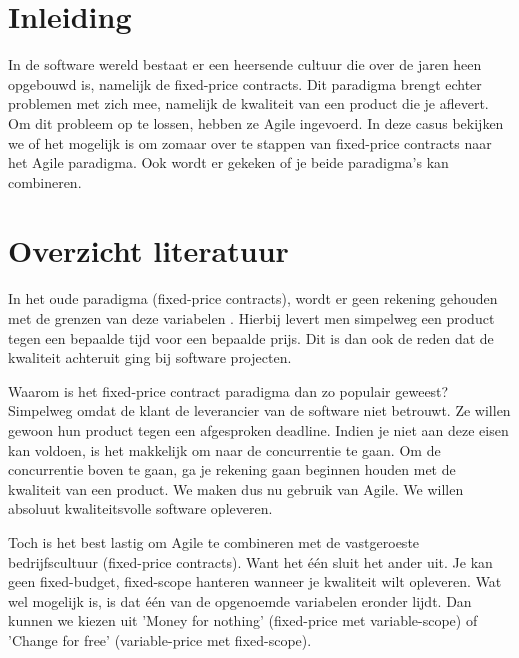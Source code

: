 \documentclass{hogent-article}
\affiliation{
    \textsuperscript{1} \href{mailto:nante.vermeulen@student.hogent.be}{nante.vermeulen@student.hogent.be}}
\affiliation{
    \textsuperscript{2} \href{mailto:mout.pessemier@student.hogent.be}{mout.pessemier@student.hogent.be}}
\affiliation{
    \textsuperscript{3} \href{mailto:indy.vancanegem@student.hogent.be}{indy.vancanegem@student.hogent.be}}
\affiliation{
    \textsuperscript{4} \href{mailto:jef.malfliet@student.hogent.be}{jef.malfliet@student.hogent.be}
}
\begin{document}
	
    \flushbottom
    \maketitle
    \tableofcontents 
    \thispagestyle{empty} %
	
	\section{Inleiding}
	
	In de software wereld bestaat er een heersende cultuur die over de jaren heen opgebouwd is, namelijk de fixed-price contracts. Dit paradigma brengt echter problemen met zich mee, namelijk de kwaliteit van een product die je aflevert. Om dit probleem op te lossen, hebben ze Agile ingevoerd. In deze casus bekijken we of het mogelijk is om zomaar over te stappen van fixed-price contracts naar het Agile paradigma. Ook wordt er gekeken of je beide paradigma's kan combineren. 
	
	\section{Overzicht literatuur}
	
	In het oude paradigma (fixed-price contracts), wordt er geen
	rekening gehouden met de grenzen van deze variabelen 	\autocite{Scrumology2012}. Hierbij levert men simpelweg een product tegen een bepaalde
	tijd voor een bepaalde prijs. Dit is dan ook de reden dat de kwaliteit achteruit ging bij software projecten. 
	
	Waarom is het fixed-price contract paradigma dan zo populair geweest? 
	Simpelweg omdat de klant de leverancier van de software niet betrouwt. Ze willen gewoon hun product tegen een 
	afgesproken deadline. Indien je niet aan deze eisen kan voldoen, is het makkelijk om naar de concurrentie te gaan. 
	Om de concurrentie boven te gaan, ga je rekening gaan beginnen houden met de kwaliteit van een product. We maken
	dus nu gebruik van Agile. We willen absoluut kwaliteitsvolle software opleveren. 
	
	Toch is het best lastig om Agile te combineren met de vastgeroeste bedrijfscultuur (fixed-price contracts). Want
	het één sluit het ander uit. Je kan geen fixed-budget, fixed-scope hanteren wanneer je kwaliteit wilt opleveren. 
	Wat wel mogelijk is, is dat één van de opgenoemde variabelen eronder lijdt. Dan kunnen we kiezen uit 
	'Money for nothing' (fixed-price met variable-scope) of 'Change for free' (variable-price met fixed-scope). 
	
\end{document}
